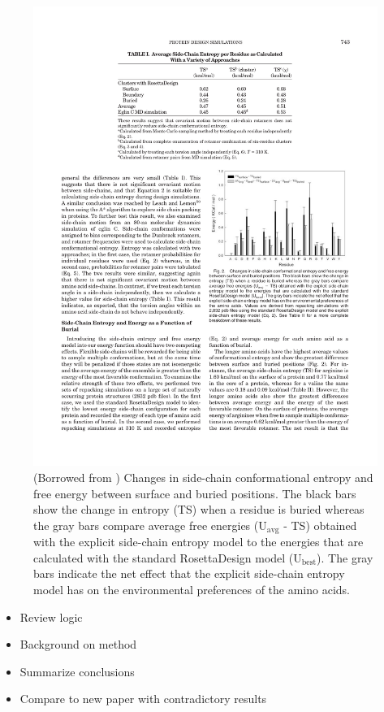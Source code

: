 \begin{figure}[h]
	\center
	\includegraphics{surface_vs_buried}
	\caption{(Borrowed from \cite{Hu:2006p68}) Changes in side-chain conformational entropy and free energy between surface and buried positions. The black bars show the change in entropy (TS) when a residue is buried whereas the gray bars compare average free energies ($\mathrm{U_{avg}}$ - TS) obtained with the explicit side-chain entropy model to the energies that are calculated with the standard RosettaDesign model ($\mathrm{U_{best}}$). The gray bars indicate the net effect that the explicit side-chain entropy model has on the environmental preferences of the amino acids.}
	\label{fig:surface_vs_buried}
\end{figure}

\begin{itemize}
	\item Review logic
	\item Background on method
	\item Summarize conclusions
	\item Compare to new paper with contradictory results
\end{itemize}
